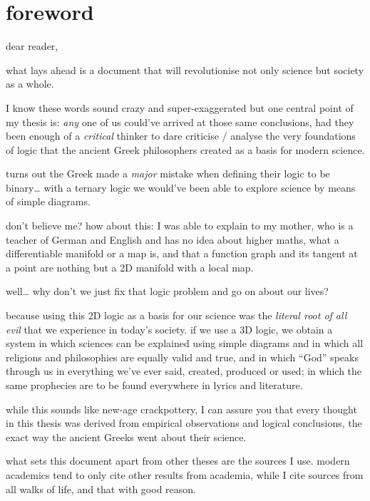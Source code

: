 \documentclass[12pt]{report}
\theoremstyle{definition}
\theoremstyle{remark}
\begin{document}
\newpage

\tableofcontents

\newpage

\section{foreword}

dear reader,

what lays ahead is a document that will revolutionise not only science but society as a whole.

I know these words sound crazy and super-exaggerated but one central point of my thesis is: \emph{any} one of us could've arrived at those same conclusions, had they been enough of a \emph{critical} thinker to dare criticise / analyse the very foundations of logic that the ancient Greek philosophers created as a basis for modern science.

turns out the Greek made a \emph{major} mistake when defining their logic to be binary… with a ternary logic we would've been able to explore science by means of simple diagrams.

don't believe me? how about this: I was able to explain to my mother, who is a teacher of German and English and has no idea about higher maths, what a differentiable manifold or a map is, and that a function graph and its tangent at a point are nothing but a 2D manifold with a local map.

well… why don't we just fix that logic problem and go on about our lives?

because using this 2D logic as a basis for our science was the \emph{literal root of all evil} that we experience in today's society. if we use a 3D logic, we obtain a system in which sciences can be explained using simple diagrams and in which all religions and philosophies are equally valid and true, and in which ``God'' speaks through us in everything we've ever said, created, produced or used; in which the same prophecies are to be found everywhere in lyrics and literature.

while this sounds like new-age crackpottery, I can assure you that every thought in this thesis was derived from empirical observations and logical conclusions, the exact way the ancient Greeks went about their science.

what sets this document apart from other theses are the sources I use. modern academics tend to only cite other results from academia, while I cite sources from all walks of life, and that with good reason.
\end{document}
